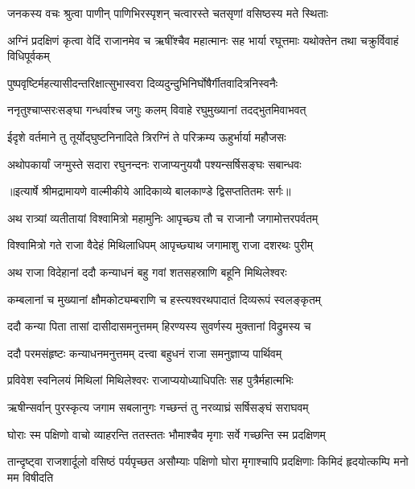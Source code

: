 \twolineshloka
{जनकस्य वचः श्रुत्वा पाणीन् पाणिभिरस्पृशन्}
{चत्वारस्ते चतसृणां वसिष्ठस्य मते स्थिताः} %

\threelineshloka
{अग्निं प्रदक्षिणं कृत्वा वेदिं राजानमेव च}
{ऋषींश्चैव महात्मानः सह भार्या रघूत्तमाः}
{यथोक्तेन तथा चक्रुर्विवाहं विधिपूर्वकम्} %

\twolineshloka
{पुष्पवृष्टिर्महत्यासीदन्तरिक्षात्सुभास्वरा}
{दिव्यदुन्दुभिनिर्घोषैर्गीतवादित्रनिस्वनैः} %

\twolineshloka
{ननृतुश्चाप्सरःसङ्घा गन्धर्वाश्च जगुः कलम्}
{विवाहे रघुमुख्यानां तदद्भुतमिवाभवत्} %

\twolineshloka
{ईदृशे वर्तमाने तु तूर्योद्घुष्टनिनादिते}
{त्रिरग्निं ते परिक्रम्य ऊहुर्भार्या महौजसः} %

\twolineshloka
{अथोपकार्यां जग्मुस्ते सदारा रघुनन्दनः}
{राजाप्यनुययौ पश्यन्सर्षिसङ्घः सबान्धवः} %


{॥इत्यार्षे श्रीमद्रामायणे वाल्मीकीये आदिकाव्ये बालकाण्डे द्विसप्ततितमः सर्गः॥}


\twolineshloka
{अथ रात्र्यां व्यतीतायां विश्वामित्रो महामुनिः}
{आपृच्छ्य तौ च राजानौ जगामोत्तरपर्वतम्} %

\twolineshloka
{विश्वामित्रो गते राजा वैदेहं मिथिलाधिपम्}
{आपृच्छ्याथ जगामाशु राजा दशरथः पुरीम्} %

\twolineshloka
{अथ राजा विदेहानां ददौ कन्याधनं बहु}
{गवां शतसहस्राणि बहूनि मिथिलेश्वरः} %

\twolineshloka
{कम्बलानां च मुख्यानां क्षौमकोट्यम्बराणि च}
{हस्त्यश्वरथपादातं दिव्यरूपं स्वलङ्कृतम्} %

\twolineshloka
{ददौ कन्या पिता तासां दासीदासमनुत्तमम्}
{हिरण्यस्य सुवर्णस्य मुक्तानां विद्रुमस्य च} %

\twolineshloka
{ददौ परमसंहृष्टः कन्याधनमनुत्तमम्}
{दत्त्वा बहुधनं राजा समनुज्ञाप्य पार्थिवम्} %

\twolineshloka
{प्रविवेश स्वनिलयं मिथिलां मिथिलेश्वरः}
{राजाप्ययोध्याधिपतिः सह पुत्रैर्महात्मभिः} %

\twolineshloka
{ऋषीन्सर्वान् पुरस्कृत्य जगाम सबलानुगः}
{गच्छन्तं तु नरव्याघ्रं सर्षिसङ्घं सराघवम्} %

\twolineshloka
{घोराः स्म पक्षिणो वाचो व्याहरन्ति ततस्ततः}
{भौमाश्चैव मृगाः सर्वे गच्छन्ति स्म प्रदक्षिणम्} %

\threelineshloka
{तान्दृष्ट्वा राजशार्दूलो वसिष्ठं पर्यपृच्छत}
{असौम्याः पक्षिणो घोरा मृगाश्चापि प्रदक्षिणाः}
{किमिदं हृदयोत्कम्पि मनो मम विषीदति} %

